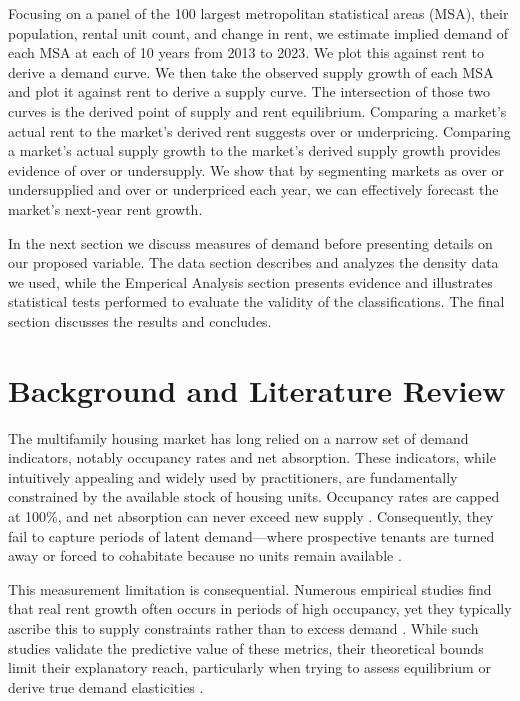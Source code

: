 \documentclass[sn-mathphys-num]{sn-jnl}%
\begin{document}
Focusing on a panel of the 100 largest metropolitan statistical areas (MSA), their population, rental unit count, and change in rent, we estimate implied demand of each MSA at each of 10 years from 2013 to 2023. We plot this against rent to derive a demand curve. We then take the observed supply growth of each MSA and plot it against rent to derive a supply curve. The intersection of those two curves is the derived point of supply and rent equilibrium. Comparing a market's actual rent to the market's derived rent suggests over or underpricing. Comparing a market's actual supply growth to the market's derived supply growth provides evidence of over or undersupply. We show that by segmenting markets as over or undersupplied and over or underpriced each year, we can effectively forecast the market's next-year rent growth.  

In the next section we discuss measures of demand before presenting details on our proposed variable. The data section describes and analyzes the density data we used, while the Emperical Analysis section presents evidence and illustrates statistical tests performed to evaluate the validity of the classifications. The final section discusses the results and concludes. 

\section*{Background and Literature Review}

The multifamily housing market has long relied on a narrow set of demand indicators, notably occupancy rates and net absorption. These indicators, while intuitively appealing and widely used by practitioners, are fundamentally constrained by the available stock of housing units. Occupancy rates are capped at 100\%, and net absorption can never exceed new supply \citep{mueller1999real, gabriel2001rental}. Consequently, they fail to capture periods of latent demand---where prospective tenants are turned away or forced to cohabitate because no units remain available \citep{sirmans1991determinants, pyhrr1999real}.

This measurement limitation is consequential. Numerous empirical studies find that real rent growth often occurs in periods of high occupancy, yet they typically ascribe this to supply constraints rather than to excess demand \citep{goodman1992rental, wheaton1991realestate}. While such studies validate the predictive value of these metrics, their theoretical bounds limit their explanatory reach, particularly when trying to assess equilibrium or derive true demand elasticities \citep{pennington2021does, molloy2022housing}.
\end{document}
